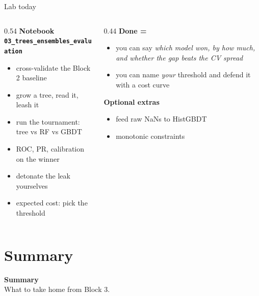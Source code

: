 \documentclass[10pt,aspectratio=169]{beamer}
\begin{document}
\begin{frame}{Lab today}
  \begin{columns}[T]
    \begin{column}{0.54\textwidth}
      \textbf{Notebook \texttt{03\_trees\_ensembles\_evaluation}}
      \begin{itemize}\small
        \item cross-validate the Block 2 baseline
        \item grow a tree, read it, leash it
        \item run the tournament: tree vs RF vs GBDT
        \item ROC, PR, calibration on the winner
        \item \alert{detonate the leak} yourselves
        \item expected cost: pick the threshold
      \end{itemize}
    \end{column}
    \begin{column}{0.44\textwidth}
      \textbf{Done =}
      \begin{itemize}\small
        \item you can say \emph{which model won, by how much, and whether
              the gap beats the CV spread}
        \item you can name \emph{your} threshold and defend it with a cost
              curve
      \end{itemize}
      \vspace{0.4em}
      \textbf{Optional extras}
      \begin{itemize}\small
        \item feed raw NaNs to HistGBDT
        \item monotonic constraints
      \end{itemize}
    \end{column}
  \end{columns}
\end{frame}

\section{Summary}

\begin{frame}[plain]
  \begin{center}
    \vspace{1.5cm}
    {\LARGE\textbf{Summary}}\\[0.6cm]
    {\normalsize What to take home from Block 3.}
  \end{center}
\end{frame}
\end{document}
